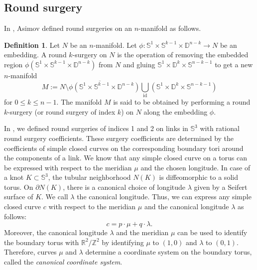 \documentclass{amsart}
\theoremstyle{plain}
\theoremstyle{remark}
\theoremstyle{definition}
\newtheorem{defn}{Definition}
\newcommand{\R}{\mathbb{R}}
\newcommand{\s}{\mathbb{S}}
\newcommand{\D}{\mathbb{D}}
\begin{document}
\subsection{Round surgery}
In \cite{Asimov}, Asimov defined round surgeries on an $n$-manifold as follows.  
\begin{defn}
Let $N$ be an $n$-manifold. 
Let $\phi : \s^1 \times \s^{k-1} \times \D^{n-k} \to N $ be an embedding. 
A round $k$-surgery on $N$ is the operation of removing the embedded region $\phi\left(\s^1 \times \s^{k-1} \times \D^{n-k}\right) $ from $N$ and gluing $\s^1 \times \D^{k} \times \s^{n-k-1}$ to get a new $n$-manifold
$$M := \overline{N \setminus \phi(\s^1 \times \s^{k-1}\times \D^{n-k})} \bigcup_{\text{id}} \left(\s^1 \times \D^{k} \times \s^{n-k-1}\right)$$
for $0\leq k\leq n-1$. 
The manifold $M$ is said to be obtained by performing a round $k$-surgery (or round surgery of index $k$) on $N$ along the embedding $\phi$. 
\end{defn}

In \cite{PD-RSD}, we defined round surgeries of indices 1 and 2 on links in $\s^3$ with rational round surgery coefficients. 
These surgery coefficients are determined by the coefficients of simple closed curves on the corresponding boundary tori around the components of a link. 
We know that any simple closed curve on a torus can be expressed with respect to the meridian $\mu$ and the chosen longitude. 
In case of a knot $K\subset \s^3$,  the tubular neighborhood $N(K)$ is diffeomorphic to a solid torus. 
On $\partial N(K)$, there is a canonical choice of longitude $\lambda$ given by a Seifert surface of $K$. 
We call $\lambda$ the canonical longitude.  
Thus, we can express any simple closed curve $c$ with respect to the meridian $\mu$ and the canonical longitude $\lambda$ as follows: 
$$ c= p\cdot \mu + q\cdot \lambda.$$ 
Moreover, the canonical longitude $\lambda$ and the meridian $\mu$ can be used to identify the boundary torus with $\R^2/\mathbb{Z}^2$ by identifying  $\mu$ to $(1,0)$ and $\lambda$ to $(0,1)$.  
Therefore, curves $\mu$ and $\lambda$ determine a coordinate system on the boundary torus, called the \textit{canonical coordinate system}. 
\end{document}
